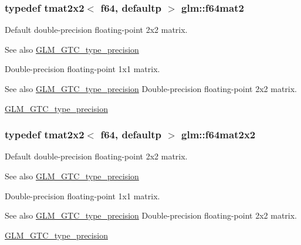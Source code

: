 \subsubsection[{f64mat2}]{\setlength{\rightskip}{0pt plus 5cm}typedef tmat2x2$<$ f64, defaultp $>$ {\bf glm\+::f64mat2}}\label{group__gtc__type__precision_gaf66aa8b74ef627da80162c17a74a04fe}
Default double-\/precision floating-\/point 2x2 matrix. \begin{DoxySeeAlso}{See also}
\hyperlink{group__gtc__type__precision}{G\+L\+M\+\_\+\+G\+T\+C\+\_\+type\+\_\+precision}
\end{DoxySeeAlso}
Double-\/precision floating-\/point 1x1 matrix. \begin{DoxySeeAlso}{See also}
\hyperlink{group__gtc__type__precision}{G\+L\+M\+\_\+\+G\+T\+C\+\_\+type\+\_\+precision} Double-\/precision floating-\/point 2x2 matrix. 

\hyperlink{group__gtc__type__precision}{G\+L\+M\+\_\+\+G\+T\+C\+\_\+type\+\_\+precision} 
\end{DoxySeeAlso}
\hypertarget{group__gtc__type__precision_ga1e14d8b4e18898be51cd719fda213dcc}{}
\subsubsection[{f64mat2x2}]{\setlength{\rightskip}{0pt plus 5cm}typedef tmat2x2$<$ f64, defaultp $>$ {\bf glm\+::f64mat2x2}}\label{group__gtc__type__precision_ga1e14d8b4e18898be51cd719fda213dcc}
Default double-\/precision floating-\/point 2x2 matrix. \begin{DoxySeeAlso}{See also}
\hyperlink{group__gtc__type__precision}{G\+L\+M\+\_\+\+G\+T\+C\+\_\+type\+\_\+precision}
\end{DoxySeeAlso}
Double-\/precision floating-\/point 1x1 matrix. \begin{DoxySeeAlso}{See also}
\hyperlink{group__gtc__type__precision}{G\+L\+M\+\_\+\+G\+T\+C\+\_\+type\+\_\+precision} Double-\/precision floating-\/point 2x2 matrix. 

\hyperlink{group__gtc__type__precision}{G\+L\+M\+\_\+\+G\+T\+C\+\_\+type\+\_\+precision} 
\end{DoxySeeAlso}
\hypertarget{group__gtc__type__precision_ga6d0196bded514d55e26e0f68dd38b37b}{}
